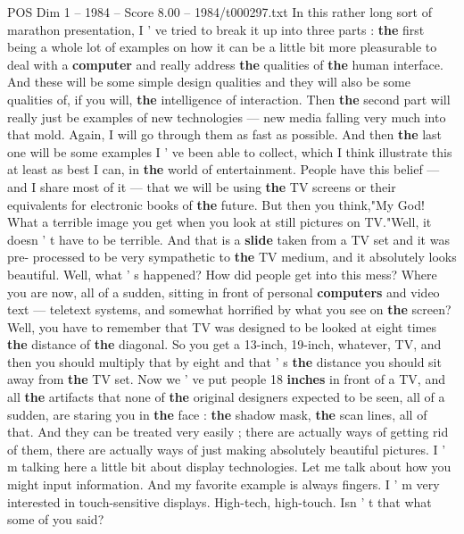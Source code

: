 \begin{textsample}{POS Dim 1 – 1984 – Score 8.00 – 1984/t000297.txt}  \label{ex:f1_pos_035}
In this rather long sort of marathon presentation, I ' ve tried to break it up into three parts : \textbf{the} first being a whole lot of examples on how it can be a little bit more pleasurable to deal with a \textbf{computer} and really address \textbf{the} qualities of \textbf{the} human interface.
And these will be some simple design qualities and they will also be some qualities of, if you will, \textbf{the} intelligence of interaction.
Then \textbf{the} second part will really just be examples of new technologies — new media falling very much into that mold.
Again, I will go through them as fast as possible.
And then \textbf{the} last one will be some examples I ' ve been able to collect, which I think illustrate this at least as best I can, in \textbf{the} world of entertainment.
People have this belief — and I share most of it — that we will be using \textbf{the} TV screens or their equivalents for electronic books of \textbf{the} future.
But then you think,"My God!
What a terrible image you get when you look at still pictures on TV."Well, it doesn ' t have to be terrible.
And that is a \textbf{slide} taken from a TV set and it was pre- processed to be very sympathetic to \textbf{the} TV medium, and it absolutely looks beautiful.
Well, what ' s happened?
How did people get into this mess?
Where you are now, all of a sudden, sitting in front of personal \textbf{computers} and video text — teletext systems, and somewhat horrified by what you see on \textbf{the} screen?
Well, you have to remember that TV was designed to be looked at eight times \textbf{the} distance of \textbf{the} diagonal.
So you get a 13-inch, 19-inch, whatever, TV, and then you should multiply that by eight and that ' s \textbf{the} distance you should sit away from \textbf{the} TV set.
Now we ' ve put people 18 \textbf{inches} in front of a TV, and all \textbf{the} artifacts that none of \textbf{the} original designers expected to be seen, all of a sudden, are staring you in \textbf{the} face : \textbf{the} shadow mask, \textbf{the} scan lines, all of that.
And they can be treated very easily ; there are actually ways of getting rid of them, there are actually ways of just making absolutely beautiful pictures.
I ' m talking here a little bit about display technologies.
Let me talk about how you might input information.
And my favorite example is always fingers.
I ' m very interested in touch-sensitive displays.
High-tech, high-touch.
Isn ' t that what some of you said?

\end{textsample}
